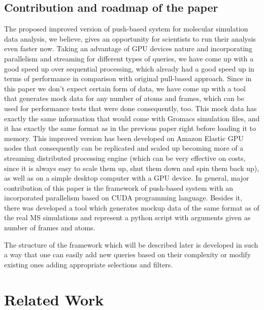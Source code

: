 \documentclass[10pt,journal,final,letterpaper,twocolumn]{IEEEtran}
\begin{document}
\subsection{Contribution and roadmap of the paper} 
The proposed improved version of push-based system for molecular simulation data analysis, we believe, gives an opportunity for scientists to run their analysis even faster now. Taking an advantage of GPU devices nature and incorporating parallelism and streaming for different types of queries, we have come up with a good speed up over sequential processing, which already had a good speed up in terms of performance in comparison with original pull-based approach. Since in this paper we don't expect certain form of data, we have come up with a tool that generates mock data for any number of atoms and frames, which can be used for performance tests that were done consequently, too. This mock data has exactly the same information that would come with Gromacs simulation files, and it has exactly the same format as in the previous paper \cite{mainPaper} right before loading it to memory. This improved version has been developed on Amazon Elastic GPU \cite{amazonGPU} nodes that consequently can be replicated and scaled up becoming more of a streaming distributed processing engine (which can be very effective on costs, since it is always easy to scale them up, shut them down and spin them back up), as well as on a simple desktop computer with a GPU device.
In general, major contribution of this paper is the framework of push-based system with an incorporated parallelism based on CUDA programming language. Besides it, there was developed a tool which generates mockup data of the same format as of the real MS simulations and represent a python script with arguments given as number of frames and atoms.

The structure of the framework which will be described later is developed in such a way that one can easily add new queries based on their complexity or modify existing ones adding appropriate selections and filters.



\vspace{3mm}
\section{Related Work}\label{sc:relatedwork}
\vspace{3mm}
\end{document}
